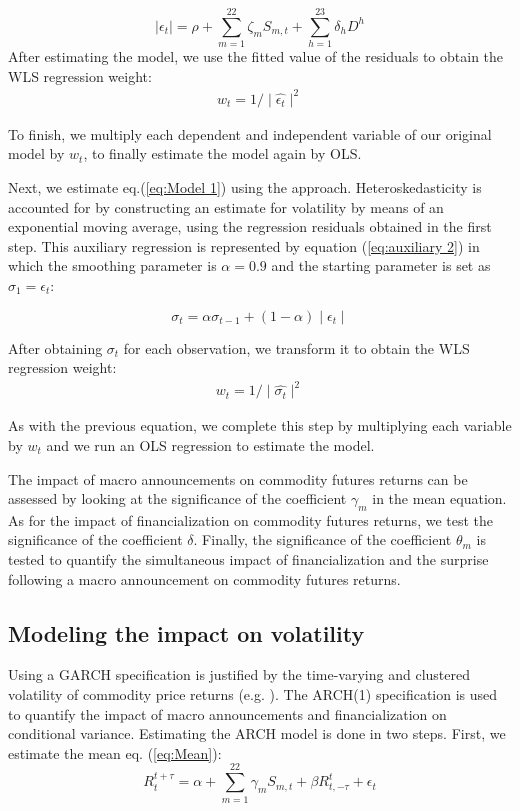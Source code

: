 \documentclass[12pt]{article}
\begin{document}
\begin{equation}\label{eq:auxiliary 1}
\mid \epsilon_{t} \mid=\rho+\sum_{m=1}^{22} \zeta_m S_{m,t}+\sum_{h=1}^{23} \delta_h D^h
\end{equation}
After estimating the model, we use the fitted value of the residuals to obtain the WLS regression weight:
\begin{align*}
w_t=1/\mid \hat{\epsilon_t} \mid^2
\end{align*}

To finish, we multiply each dependent and independent variable of our original model by $w_t$, to finally estimate the model again by OLS.

Next, we estimate eq.(\ref{eq:Model 1}) using the \citet{kurov2019price} approach. Heteroskedasticity is accounted for by constructing an estimate for volatility by means of an exponential moving average, using the regression residuals obtained in the first step. This auxiliary regression is represented by equation (\ref{eq:auxiliary 2}) in which the smoothing parameter is $\alpha=0.9$ and the starting parameter is set as $\sigma_1=\epsilon_t$:

\begin{equation}\label{eq:auxiliary 2}
\sigma_t=\alpha \sigma_{t-1}+(1-\alpha) \mid \epsilon_t \mid 
\end{equation} 

After obtaining  $\sigma_t$ for each observation, we transform it to obtain the WLS regression weight:
\begin{align*}
w_t=1/\mid \hat{\sigma_t} \mid^2
\end{align*}

As with the previous equation, we complete this step by multiplying each variable by  $w_t$ and we run an OLS regression to estimate the model.%

 The impact of macro announcements on commodity futures returns  can be assessed by looking at the significance of the coefficient $\gamma_m$ in the mean equation. As for the impact of financialization on commodity futures returns, we test the significance of the coefficient $\delta$. Finally, the significance of the coefficient $\theta_m$ is tested to quantify the simultaneous impact of financialization and the surprise following a macro announcement on commodity futures returns.
 
\subsection{Modeling the impact on volatility}\label{variance}
Using a GARCH specification is justified by the time-varying and clustered volatility of commodity price returns (e.g. \citep{hammoudeh2008metal}).
The ARCH(1) specification is used to quantify the impact of macro announcements and financialization on conditional variance. Estimating the ARCH model is done in two steps. First, we estimate the mean eq. (\ref{eq:Mean}):
\begin{equation}\label{eq:Mean}R_{t}^{t+\tau}=\alpha+\sum_{m=1}^{22} \gamma_m S_{m,t}+\beta R_{t,-\tau}^{t}+\epsilon_{t}
\end{equation}
\end{document}
